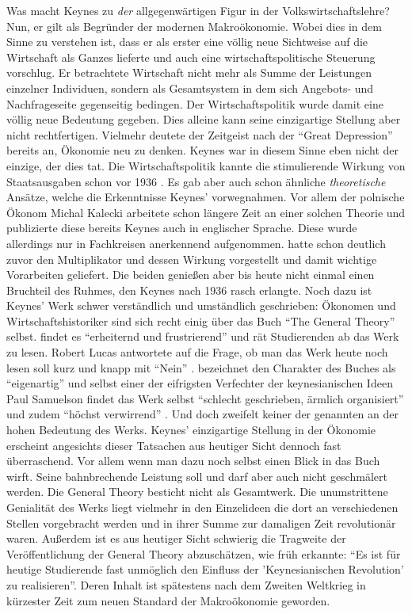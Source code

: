 Was macht Keynes zu \textit{der} allgegenwärtigen Figur in der Volkswirtschaftslehre? Nun, er gilt als Begründer der modernen Makroökonomie. Wobei dies in dem Sinne zu verstehen ist, dass er als erster eine völlig neue Sichtweise auf die Wirtschaft als Ganzes lieferte und auch eine wirtschaftspolitische Steuerung vorschlug. Er betrachtete Wirtschaft nicht mehr als Summe der Leistungen einzelner Individuen, sondern als Gesamtsystem in dem sich Angebots- und Nachfrageseite gegenseitig bedingen. Der Wirtschaftspolitik wurde damit eine völlig neue Bedeutung gegeben. Dies alleine kann seine einzigartige Stellung aber nicht rechtfertigen. Vielmehr deutete der Zeitgeist nach der "`Great Depression"' bereits an, Ökonomie neu zu denken. Keynes war in diesem Sinne eben nicht der einzige, der dies tat. Die Wirtschaftspolitik kannte die stimulierende Wirkung von Staatsausgaben schon vor 1936 \parencite{Fishback2010}. Es gab aber auch schon ähnliche \textit{theoretische} Ansätze, welche die Erkenntnisse Keynes' vorwegnahmen. Vor allem der polnische Ökonom Michal Kalecki arbeitete schon längere Zeit an einer solchen Theorie und publizierte diese \parencite{Kalecki1935} bereits Keynes auch in englischer Sprache. Diese wurde allerdings nur in Fachkreisen anerkennend aufgenommen. \textcite{Kahn1931} hatte schon deutlich zuvor den Multiplikator und dessen Wirkung vorgestellt und damit wichtige Vorarbeiten geliefert. Die beiden genießen aber bis heute nicht einmal einen Bruchteil des Ruhmes, den Keynes nach 1936 rasch erlangte. Noch dazu ist Keynes' Werk schwer verständlich und umständlich geschrieben: Ökonomen und Wirtschaftshistoriker sind sich recht einig über das Buch "`The General Theory"' selbst. \textcite [S. 31]{Mankiw2006} findet es "`erheiternd und frustrierend"' und rät Studierenden ab das Werk zu lesen. Robert Lucas antwortete auf die Frage, ob man das Werk heute noch lesen soll kurz und knapp mit "`Nein"' \parencite{Lucas2013}. \textcite[S. 429]{Rosner2012} bezeichnet den Charakter des Buches als "`eigenartig"' und selbst einer der eifrigsten Verfechter der keynesianischen Ideen Paul Samuelson findet das Werk selbst "`schlecht geschrieben, ärmlich organisiert"' und zudem "`höchst verwirrend"' \parencite[S. 190]{Samuelson1946}. Und doch zweifelt keiner der genannten an der hohen Bedeutung des Werks. Keynes' einzigartige Stellung in der Ökonomie erscheint angesichts dieser Tatsachen aus heutiger Sicht dennoch fast überraschend. Vor allem wenn man dazu noch selbst einen Blick in das Buch wirft. Seine bahnbrechende Leistung soll und darf aber auch nicht geschmälert werden. Die General Theory besticht nicht als Gesamtwerk. Die unumstrittene Genialität des Werks liegt vielmehr in den Einzelideen die dort an verschiedenen Stellen vorgebracht werden und in ihrer Summe zur damaligen Zeit revolutionär waren. Außerdem ist es aus heutiger Sicht schwierig die Tragweite der Veröffentlichung der General Theory abzuschätzen, wie \textcite[S. 187]{Samuelson1946} früh erkannte: "`Es ist für heutige Studierende fast unmöglich  den Einfluss der 'Keynesianischen Revolution' zu realisieren"'. Deren Inhalt ist spätestens nach dem Zweiten Weltkrieg in kürzester Zeit zum neuen Standard der Makroökonomie geworden. 

